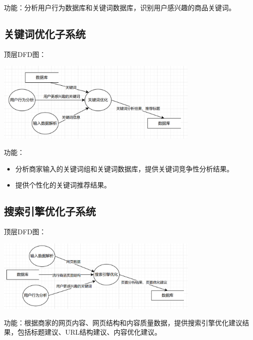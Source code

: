 \documentclass[11pt, a4paper, oneside]{ctexbook}
\begin{document}
功能：分析用户行为数据库和关键词数据库，识别用户感兴趣的商品关键词。


\subsection{关键词优化子系统}
顶层DFD图：

\includegraphics[width=0.75\textwidth]{关键词优化2_4.png}

功能：
\begin{itemize}
    \item 分析商家输入的关键词组和关键词数据库，提供关键词竞争性分析结果。
    \item 提供个性化的关键词推荐结果。
\end{itemize}

\subsection{搜索引擎优化子系统}
顶层DFD图：

\includegraphics[width=0.75\textwidth]{搜索引擎优化2_5.png}

功能：根据商家的网页内容、网页结构和内容质量数据，提供搜索引擎优化建议结果，包括标题建议、URL结构建议、内容优化建议。
\end{document}

